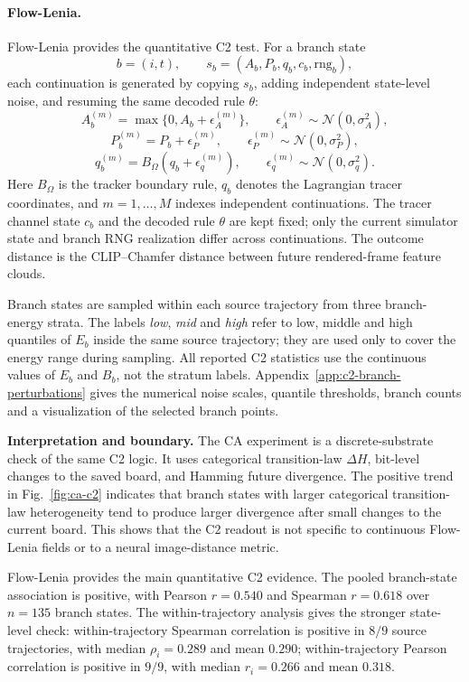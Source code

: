 \paragraph{Flow-Lenia.}
Flow-Lenia provides the quantitative C2 test. For a branch state
\[
  b=(i,t),\qquad s_b=(A_b,P_b,q_b,c_b,\mathrm{rng}_b),
\]
each continuation is generated by copying $s_b$, adding independent state-level noise, and resuming the same decoded rule $\theta$:
\[
  A^{(m)}_b=\max\{0,A_b+\epsilon^{(m)}_A\},
  \qquad
  \epsilon^{(m)}_A\sim\mathcal N(0,\sigma_A^2),
\]
\[
  P^{(m)}_b=P_b+\epsilon^{(m)}_P,
  \qquad
  \epsilon^{(m)}_P\sim\mathcal N(0,\sigma_P^2),
\]
\[
  q^{(m)}_b=B_\Omega(q_b+\epsilon^{(m)}_q),
  \qquad
  \epsilon^{(m)}_q\sim\mathcal N(0,\sigma_q^2).
\]
Here $B_\Omega$ is the tracker boundary rule, $q_b$ denotes the Lagrangian tracer coordinates, and $m=1,\ldots,M$ indexes independent continuations.  The tracer channel state $c_b$ and the decoded rule $\theta$ are kept fixed; only the current simulator state and branch RNG realization differ across continuations.  The outcome distance is the CLIP--Chamfer distance between future rendered-frame feature clouds.

Branch states are sampled within each source trajectory from three branch-energy strata.  The labels \textit{low}, \textit{mid} and \textit{high} refer to low, middle and high quantiles of $E_b$ inside the same source trajectory; they are used only to cover the energy range during sampling.  All reported C2 statistics use the continuous values of $E_b$ and $B_b$, not the stratum labels.  Appendix~\ref{app:c2-branch-perturbations} gives the numerical noise scales, quantile thresholds, branch counts and a visualization of the selected branch points.


\textbf{Interpretation and boundary.}
The CA experiment is a discrete-substrate check of the same C2 logic.  It uses categorical transition-law $\Delta H$, bit-level changes to the saved board, and Hamming future divergence.  The positive trend in Fig.~\ref{fig:ca-c2} indicates that branch states with larger categorical transition-law heterogeneity tend to produce larger divergence after small changes to the current board.  This shows that the C2 readout is not specific to continuous Flow-Lenia fields or to a neural image-distance metric.

Flow-Lenia provides the main quantitative C2 evidence.  The pooled branch-state association is positive, with Pearson $r=0.540$ and Spearman $r=0.618$ over $n=135$ branch states.  The within-trajectory analysis gives the stronger state-level check: within-trajectory Spearman correlation is positive in $8/9$ source trajectories, with median $\rho_i=0.289$ and mean $0.290$; within-trajectory Pearson correlation is positive in $9/9$, with median $r_i=0.266$ and mean $0.318$.

